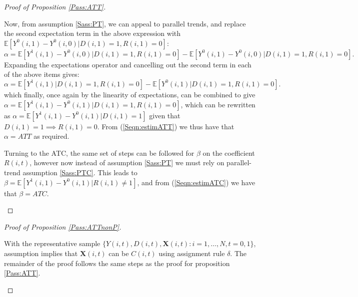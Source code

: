\begin{proof}[Proof of Proposition \ref{Pass:ATT}]
\begin{footnotesize}
Now, from assumption \ref{Sass:PT}, we can appeal to parallel trends, and 
replace the second expectation term in the above expression with $\mathbb{E}
[Y^0(i,1)-Y^0(i,0)|D(i,1)=1,R(i,1)=0]$:
\begin{equation}
\nonumber
\label{Seqn:alphaProof4}
\alpha=\mathbb{E}[Y^1(i,1)-Y^0(i,0)|D(i,1)=1,R(i,1)=0] - \mathbb{E}[Y^0(i,1)-Y^0(i,0)|D(i,1)=1,R(i,1)=0].
\end{equation}
Expanding the expectations operator and cancelling out the second term in each of
the above items gives:
\begin{equation}
\nonumber
\label{Seqn:alphaProof5}
\alpha=\mathbb{E}[Y^1(i,1)|D(i,1)=1,R(i,1)=0] - \mathbb{E}[Y^0(i,1)|D(i,1)=1,R(i,1)=0].
\end{equation}
which finally, once again by the linearity of expectations, can be combined to 
give $\alpha=\mathbb{E}[Y^1(i,1)-Y^0(i,1)|D(i,1)=1,R(i,1)=0]$, which can be 
rewritten as $\alpha=\mathbb{E}[Y^1(i,1)-Y^0(i,1)|D(i,1)=1]$ given that $D(i,1)=1 
\implies R(i,1)=0$.  From (\ref{Seqn:estimATT}) we thus have that $\alpha=ATT$ 
as required.

Turning to the ATC, the same set of steps can be followed for $\beta$ on the 
coefficient $R(i,t)$, however now instead of assumption \ref{Sass:PT} we must
rely on parallel-trend assumption \ref{Sass:PTC}. This leads to $\beta=
\mathbb{E}[Y^1(i,1)-Y^0(i,1)|R(i,1)\neq 1]$, and from (\ref{Seqn:estimATC}) we 
have that $\beta=ATC$.
\end{footnotesize}
\end{proof}

\begin{proof}[Proof of Proposition \ref{Pass:ATTnonP}]
\begin{footnotesize}
With the representative sample $\{Y(i,t), D(i,t), \mathbf{X}(i,t): i=1, \ldots, N, 
t=0, 1\}$, assumption  implies that $\mathbf{X}(i,t)$ can
be $C(i,t)$ using assignment rule $\delta$.  The remainder of the proof follows
the same steps as the proof for proposition \ref{Pass:ATT}.
\end{footnotesize}
\end{proof}


\clearpage

